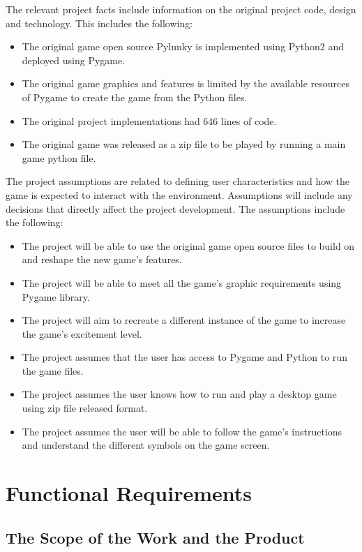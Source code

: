 \documentclass[12pt, titlepage]{article}
\begin{document}
The relevant project facts include information on the original project code, design and technology. This includes the following:
\begin{itemize}
    \item The original game open source Pylunky is implemented using Python2 and deployed using Pygame. 
    \item The original game graphics and features is limited by the available resources of Pygame to create the game from the Python files. 
    \item The original project implementations had 646 lines of code.
    \item The original game was released as a zip file to be played by running a main game python file.
\end{itemize}
The project assumptions are related to defining user characteristics and how the game is expected to interact with the environment. Assumptions will include any decisions that directly affect the project development. The assumptions include the following:
\begin{itemize}
    \item The project will be able to use the original game open source files to build on and reshape the new game's features. 
    \item The project will be able to meet all the game's graphic requirements using Pygame library.
    \item The project will aim to recreate a different instance of the game to increase the game's excitement level. 
    \item The project assumes that the user has access to Pygame and Python to run the game files. 
    \item The project assumes the user knows how to run and play a desktop game using zip file released format. 
    \item The project assumes the user will be able to follow the game's instructions and understand the different symbols on the game screen. 
\end{itemize}

\section{Functional Requirements}

\subsection{The Scope of the Work and the Product} %
\end{document}
